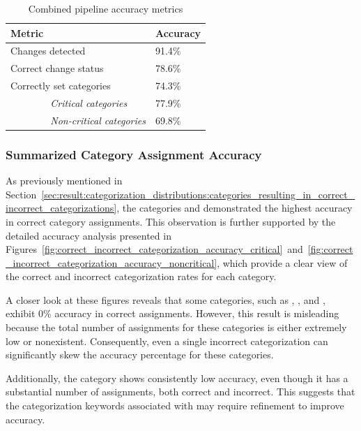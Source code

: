 \begin{table}[H]
    \centering
    \begin{tabular}{l l}
        \toprule
        \textbf{Metric} & \textbf{Accuracy} \\
        \midrule
        Changes detected & 91.4\% \\
        Correct change status & 78.6\% \\
        Correctly set categories & 74.3\% \\
        \textit{\ \ \ \ \ \ \ \ Critical categories} & 77.9\% \\
        \textit{\ \ \ \ \ \ \ \ Non-critical categories} & 69.8\% \\
        \bottomrule
    \end{tabular}
    \caption{Combined pipeline accuracy metrics}
    \label{tab:overall_accuracy}
\end{table}


\subsubsection{Summarized Category Assignment Accuracy}

As previously mentioned in Section~\ref{sec:result:categorization_distributions:categories_resulting_in_correct_incorrect_categorizations}, the categories  and  demonstrated the highest accuracy in correct category assignments. This observation is further supported by the detailed accuracy analysis presented in Figures~\ref{fig:correct_incorrect_categorization_accuracy_critical}~and~\ref{fig:correct_incorrect_categorization_accuracy_noncritical}, which provide a clear view of the correct and incorrect categorization rates for each category.

A closer look at these figures reveals that some categories, such as , , and , exhibit 0\% accuracy in correct assignments. However, this result is misleading because the total number of assignments for these categories is either extremely low or nonexistent. Consequently, even a single incorrect categorization can significantly skew the accuracy percentage for these categories.

Additionally, the category  shows consistently low accuracy, even though it has a substantial number of assignments, both correct and incorrect. This suggests that the categorization keywords associated with  may require refinement to improve accuracy.

